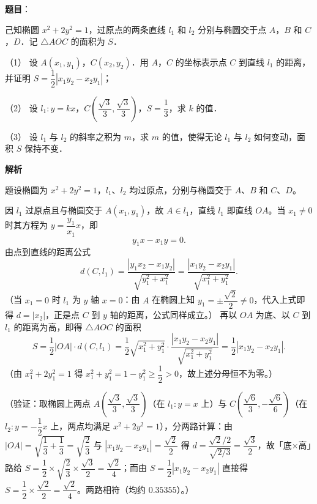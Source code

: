 \begin{answer}

\textbf{题目}：

己知椭圆 \(x^{2}+2y^{2}=1\)，过原点的两条直线 \(l_{1}\) 和 \(l_{2}\) 分别与椭圆交于点 \(A\)，\(B\) 和 \(C\)，\(D\)．记 \(\triangle AOC\) 的面积为 \(S\)．

（1） 设 \(A(x_{1},y_{1})\)，\(C(x_{2},y_{2})\)．用 \(A\)，\(C\) 的坐标表示点 \(C\) 到直线 \(l_{1}\) 的距离，并证明 \(S=\dfrac{1}{2}|x_{1}y_{2}-x_{2}y_{1}|\)；

（2） 设 \(l_{1}:y=kx\)，\(C\left(\dfrac{\sqrt{3}}{3},\dfrac{\sqrt{3}}{3}\right)\)，\(S=\dfrac{1}{3}\)，求 \(k\) 的值．

（3） 设 \(l_{1}\) 与 \(l_{2}\) 的斜率之积为 \(m\)，求 \(m\) 的值，使得无论 \(l_{1}\) 与 \(l_{2}\) 如何变动，面积 \(S\) 保持不变．

\textbf{解析}

题设椭圆为 \(x^{2}+2y^{2}=1\)，\(l_{1}\)、\(l_{2}\) 均过原点，分别与椭圆交于 \(A\)、\(B\) 和 \(C\)、\(D\)。


因 \(l_{1}\) 过原点且与椭圆交于 \(A(x_{1},y_{1})\)，故 \(A\in l_{1}\)，直线 \(l_{1}\) 即直线 \(OA\)。当 \(x_{1}\neq0\) 时其方程为 \(y=\dfrac{y_{1}}{x_{1}}x\)，即
\nopagebreak[4]
\[
y_{1}x-x_{1}y=0.
\]
由点到直线的距离公式
\nopagebreak[4]
\[
d(C,l_{1})=\frac{|y_{1}x_{2}-x_{1}y_{2}|}{\sqrt{y_{1}^{2}+x_{1}^{2}}}=\frac{|x_{1}y_{2}-x_{2}y_{1}|}{\sqrt{x_{1}^{2}+y_{1}^{2}}}.
\]
（当 \(x_{1}=0\) 时 \(l_{1}\) 为 \(y\) 轴 \(x=0\)：由 \(A\) 在椭圆上知 \(y_{1}=\pm\dfrac{\sqrt2}{2}\neq0\)，代入上式即得 \(d=|x_{2}|\)，正是点 \(C\) 到 \(y\) 轴的距离，公式同样成立。）
再以 \(OA\) 为底、以 \(C\) 到 \(l_{1}\) 的距离为高，即得 \(\triangle AOC\) 的面积
\nopagebreak[4]
\[
S=\frac{1}{2}|OA|\cdot d(C,l_{1})=\frac{1}{2}\sqrt{x_{1}^{2}+y_{1}^{2}}\cdot\frac{|x_{1}y_{2}-x_{2}y_{1}|}{\sqrt{x_{1}^{2}+y_{1}^{2}}}=\frac{1}{2}|x_{1}y_{2}-x_{2}y_{1}|.
\]
（由 \(x_{1}^{2}+2y_{1}^{2}=1\) 得 \(x_{1}^{2}+y_{1}^{2}=1-y_{1}^{2}\geqslant\dfrac{1}{2}>0\)，故上述分母恒不为零。）

（验证：取椭圆上两点 \(A\left(\dfrac{\sqrt3}{3},\dfrac{\sqrt3}{3}\right)\)（在 \(l_{1}:y=x\) 上）与 \(C\left(\dfrac{\sqrt6}{3},-\dfrac{\sqrt6}{6}\right)\)（在 \(l_{2}:y=-\dfrac{1}{2}x\) 上，两点均满足 \(x^{2}+2y^{2}=1\)），分两路计算：由 \(|OA|=\sqrt{\dfrac{1}{3}+\dfrac{1}{3}}=\sqrt{\dfrac{2}{3}}\) 与 \(|x_{1}y_{2}-x_{2}y_{1}|=\dfrac{\sqrt2}{2}\) 得 \(d=\dfrac{\sqrt2/2}{\sqrt{2/3}}=\dfrac{\sqrt3}{2}\)，故「底×高」路给 \(S=\dfrac{1}{2}\times\sqrt{\dfrac{2}{3}}\times\dfrac{\sqrt3}{2}=\dfrac{\sqrt2}{4}\)；而由 \(S=\dfrac{1}{2}|x_{1}y_{2}-x_{2}y_{1}|\) 直接得 \(S=\dfrac{1}{2}\times\dfrac{\sqrt2}{2}=\dfrac{\sqrt2}{4}\)。两路相符（均约 \(0.35355\)）。）


\end{answer}
